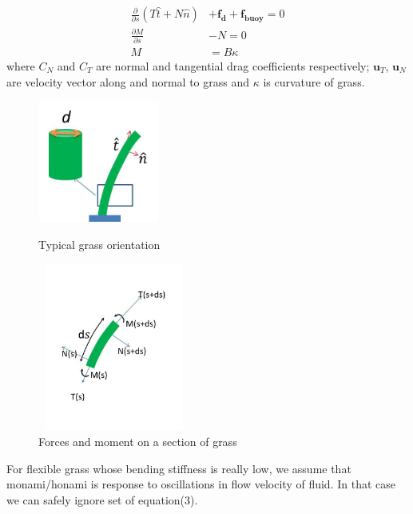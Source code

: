 \documentclass[aps,preprint,floatfix,prl]{revtex4-1}
\newcommand{\bu}{\mathbf{u}}
\newcommand{\del}{\partial}
\begin{document}
\begin{equation}
\begin{split}
 \frac{\del}{\del s}\left(T\hat{t}+N\hat{n}\right) & +\mathbf{f_{d}}+\mathbf{f_{buoy}} = 0\\
 \frac{\del M}{\del s}&-N = 0\\
 M &= B\kappa
\end{split}
\end{equation}
where $C_{N}$ and $C_{T}$ are normal and tangential drag coefficients respectively; $\bu_{T}$, $\bu_{N}$ are velocity vector along and normal to grass and $\kappa$ is curvature 
of grass.  
\begin{center}
\begin{figure}[ht]
\begin{minipage}[b]{5cm}
\centering
 \includegraphics[width=4.0cm,height=4.0cm]{Grass_orientation}
\caption{Typical grass orientation}
\end{minipage}
\hspace{1.0cm}
\begin{minipage}[b]{5cm}
\centering
 \includegraphics[width=5.0cm,height=5.5cm]{Grass_orientation2} 
\caption{Forces and moment on a section of grass}
\end{minipage}
\end{figure}
\end{center}
For flexible grass whose bending stiffness is really low, we assume that monami/honami is response to oscillations in flow velocity of fluid. In that case we can safely ignore
set of equation(3).
\end{document}
